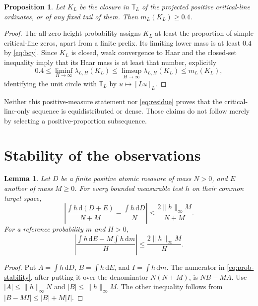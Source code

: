 \documentclass[11pt,a4paper]{article}
\newtheorem{proposition}[theorem]{Proposition}
\newtheorem{lemma}[theorem]{Lemma}
\theoremstyle{definition}
\theoremstyle{remark}
\newcommand{\T}{\mathbb T}
\newcommand{\dd}{\,\mathrm d}
\begin{document}
\begin{proposition}\label{prop:closure}
Let $K_L$ be the closure in $\T_L$ of the projected positive critical-line
ordinates, or of any fixed tail of them. Then $m_L(K_L)\ge0.4$.
\end{proposition}
\begin{proof}
The all-zero height probability assigns $K_L$ at least the proportion of
simple critical-line zeros, apart from a finite prefix. Its limiting lower
mass is at least $0.4$ by \eqref{eq:bcy}. Since $K_L$ is closed, weak
convergence to Haar and the closed-set inequality imply that its Haar mass
is at least that number, explicitly
\[
 0.4\le\liminf_{H\to\infty}\lambda_{L,H}(K_L)
 \le\limsup_{H\to\infty}\lambda_{L,H}(K_L)\le m_L(K_L),
\]
identifying the unit circle with $\T_L$ by $u\mapsto[Lu]_L$.
\end{proof}
Neither this positive-measure statement nor \eqref{eq:residue} proves that
the critical-line-only sequence is equidistributed or dense. Those claims
do not follow merely by selecting a positive-proportion subsequence.

\section{Stability of the observations}\label{sec:secondary}

\begin{lemma}\label{lem:stability}
Let $D$ be a finite positive atomic measure of mass $N>0$, and $E$ another
of mass $M\ge0$. For every bounded measurable test $h$ on their common target space,
\begin{equation}\label{eq:prob-stability}
 \left|\frac{\int h\dd(D+E)}{N+M}-\frac{\int h\dd D}{N}\right|
       \le\frac{2\|h\|_\infty M}{N+M}.
\end{equation}
For a reference probability $m$ and $H>0$,
\begin{equation}\label{eq:secondary-stability}
 \left|\frac{\int h\dd E-M\int h\dd m}{H}\right|
       \le\frac{2\|h\|_\infty M}{H}.
\end{equation}
\end{lemma}
\begin{proof}
Put $A=\int h\dd D$, $B=\int h\dd E$, and $I=\int h\dd m$.
The numerator in \eqref{eq:prob-stability}, after putting it over the
denominator $N(N+M)$, is $NB-MA$. Use
$|A|\le\|h\|_\infty N$ and $|B|\le\|h\|_\infty M$.
The other inequality follows from $|B-MI|\le |B|+M|I|$.
\end{proof}
\end{document}
